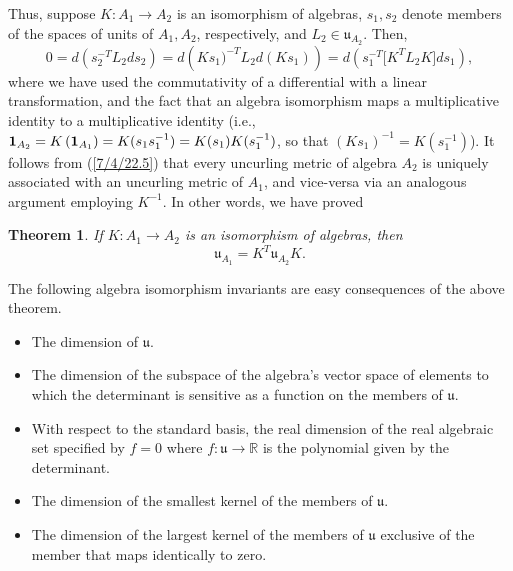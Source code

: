 \documentclass{amsart}
\numberwithin{equation}{section}
\newtheorem{theorem}{Theorem}
\theoremstyle{definition}
\numberwithin{theorem}{section}
\begin{document}
Thus, suppose $K:A_1\rightarrow A_2$ is an isomorphism of algebras, $s_1,s_2$ denote members of the spaces of units of $A_1,A_2$, respectively, and $L_2\in \mathfrak{u}_{A_2}$.  Then, \begin{equation} 0 = d\left(s_2^{-T}L_2 ds_2\right) =  d\left(Ks_1)^{-T}L_2 d(Ks_1)\right) =d\left(s_1^{-T} \big[K^T L_2K\big]ds_1\right), \label{7/4/22.5}  \end{equation} where we have used the commutativity of a differential with a linear transformation, and the fact that an algebra isomorphism maps a multiplicative identity to a multiplicative identity (i.e., ${\bf 1}_{A_2} = K\left(\mathbf{1}_{A_1}\right) = K(s_1s_1^{-1}) = K(s_1)K(s_1^{-1})$, so that $(Ks_1)^{-1} = K(s_1^{-1})$).  It follows from (\ref{7/4/22.5}) that every uncurling metric of algebra $A_2$ is uniquely associated with an uncurling metric of $A_1$, and vice-versa via an analogous argument employing $K^{-1}$.  In other words, we have proved

\begin{theorem} \label{6/6/23.1} If $K:A_1\rightarrow A_2$ is an isomorphism of algebras, then \begin{equation}\label{5/23/23.1} \mathfrak{u}_{A_1} = K^T \mathfrak{u}_{A_2} K. \end{equation} \end{theorem}

The following algebra isomorphism invariants are easy consequences of the above theorem.   
\begin{itemize} \item The dimension of $\mathfrak{u}$. \item The dimension of the subspace of the algebra's vector space of elements to which the determinant is sensitive as a function on the members of $\mathfrak{u}$. \item With respect to the standard basis, the real dimension of the real algebraic set specified by $f=0$ where $f:\mathfrak{u}\rightarrow \mathbb{R}$ is the polynomial given by the determinant.  \item The dimension of the smallest kernel of the members of $\mathfrak{u}$.  \item The dimension of the largest kernel of the members of $\mathfrak{u}$ exclusive of the member that maps identically to zero.\end{itemize} 
\end{document}
